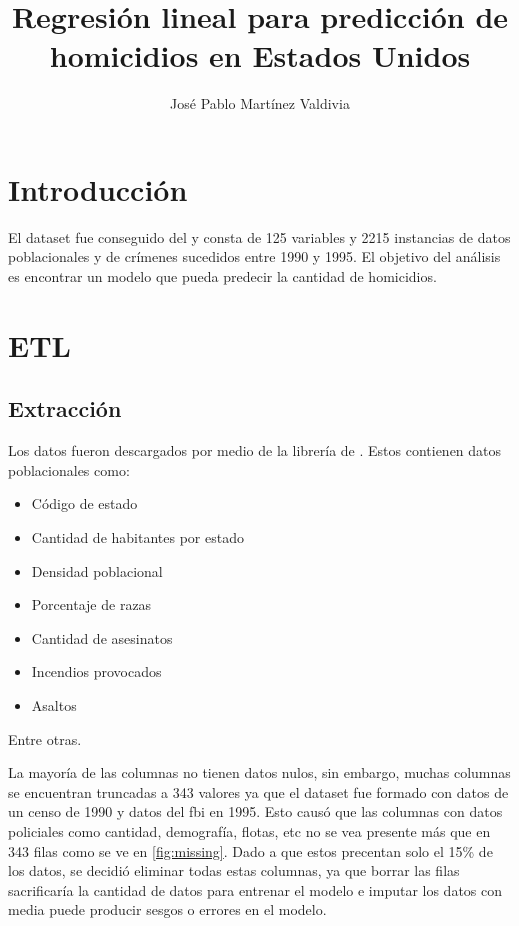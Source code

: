 \documentclass[twocolumn]{article}
\title{Regresión lineal para predicción de homicidios en Estados Unidos}
\author{José Pablo Martínez Valdivia}
\begin{document}


\section{Introducción}
El dataset  fue conseguido del 
 y consta de 125 variables y 2215 instancias
de datos poblacionales y de crímenes sucedidos entre 1990 y 1995. El objetivo 
del análisis es encontrar un modelo que pueda predecir la cantidad de homicidios.

\section{ETL}
\subsection{Extracción}
Los datos fueron descargados por medio de la librería de . Estos contienen 
datos poblacionales como:
\begin{itemize}
  \item Código de estado
  \item Cantidad de habitantes por estado
  \item Densidad poblacional
  \item Porcentaje de razas
  \item Cantidad de asesinatos
  \item Incendios provocados
  \item Asaltos
\end{itemize}
Entre otras. 

La mayoría de las columnas no tienen datos nulos, sin embargo, muchas columnas 
se encuentran truncadas a 343 valores ya que el dataset fue formado con datos 
de un censo de 1990 y datos del fbi en 1995. Esto causó que las columnas con
datos policiales como cantidad, demografía, flotas, etc no se vea presente más 
que en 343 filas como se ve en \ref{fig:missing}. Dado a que estos precentan solo
el 15\% de los datos, se decidió eliminar todas estas columnas, ya que borrar 
las filas sacrificaría la cantidad de datos para entrenar el modelo e imputar 
los datos con media puede producir sesgos o errores en el modelo.
\end{document}
